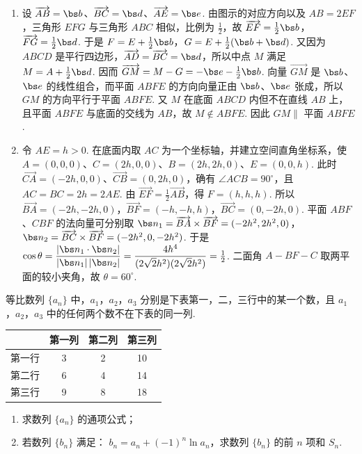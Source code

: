 \begin{solution}
\begin{enumerate}
\item 设 \(\overrightarrow{AB}=\bs b\)、\(\overrightarrow{BC}=\bs d\)、\(\overrightarrow{AE}=\bs e\). 由图示的对应方向以及 \(AB=2EF\)，三角形 \(EFG\) 与三角形 \(ABC\) 相似，比例为 \(\frac12\)，故
\(\overrightarrow{EF}=\frac12\bs b\)，\(\overrightarrow{FG}=\frac12\bs d\).
于是 \(F=E+\frac12\bs b\)，\(G=E+\frac12(\bs b+\bs d)\). 又因为 \(ABCD\) 是平行四边形，\(\overrightarrow{AD}=\overrightarrow{BC}=\bs d\)，所以中点 \(M\) 满足 \(M=A+\frac12\bs d\). 因而
\(\overrightarrow{GM}=M-G=-\bs e-\frac12\bs b\).
向量 \(\overrightarrow{GM}\) 是 \(\bs b\)、\(\bs e\) 的线性组合，而平面 \(ABFE\) 的方向向量正由 \(\bs b\)、\(\bs e\) 张成，所以 \(GM\) 的方向平行于平面 \(ABFE\). 又 \(M\) 在底面 \(ABCD\) 内但不在直线 \(AB\) 上，且平面 \(ABFE\) 与底面的交线为 \(AB\)，故 \(M\notin ABFE\). 因此 \(GM\parallel\) 平面 \(ABFE\).
\item 令 \(AE=h>0\). 在底面内取 \(AC\) 为一个坐标轴，并建立空间直角坐标系，使
\(A=(0,0,0)\)、\(C=(2h,0,0)\)、\(B=(2h,2h,0)\)、\(E=(0,0,h)\). 此时
\(\overrightarrow{CA}=(-2h,0,0)\)、\(\overrightarrow{CB}=(0,2h,0)\)，确有 \(\angle ACB=90^\circ\)，且 \(AC=BC=2h=2AE\).
由 \(\overrightarrow{EF}=\frac12\overrightarrow{AB}\)，得 \(F=(h,h,h)\). 所以
\(\overrightarrow{BA}=(-2h,-2h,0)\)，\(\overrightarrow{BF}=(-h,-h,h)\)，\(\overrightarrow{BC}=(0,-2h,0)\).
平面 \(ABF\)、\(CBF\) 的法向量可分别取
\(\bs n_1=\overrightarrow{BA}\times\overrightarrow{BF}=(-2h^2,2h^2,0)\)，
\(\bs n_2=\overrightarrow{BC}\times\overrightarrow{BF}=(-2h^2,0,-2h^2)\).
于是
\(\cos\theta=\dfrac{|\bs n_1\cdot\bs n_2|}{|\bs n_1|\,|\bs n_2|}=\dfrac{4h^4}{(2\sqrt2h^2)(2\sqrt2h^2)}=\frac12\).
二面角 \(A-BF-C\) 取两平面的较小夹角，故 \(\theta=60^\circ\).
\end{enumerate}
\end{solution}

\begin{problem}
等比数列 \(\{a_{n}\}\) 中，\(a_{1}\)，\(a_{2}\)，\(a_{3}\) 分别是下表第一，二，三行中的某一个数，且 \(a_{1}\)，\(a_{2}\)，\(a_{3}\) 中的任何两个数不在下表的同一列.

\begin{center}
\begin{tabular}{c|ccc}
 & 第一列 & 第二列 & 第三列 \\
\hline
第一行 & 3 & 2 & 10 \\
第二行 & 6 & 4 & 14 \\
第三行 & 9 & 8 & 18
\end{tabular}
\end{center}

\begin{enumerate}
\item 求数列 \(\{a_{n}\}\) 的通项公式；
\item 若数列 \(\{b_{n}\}\) 满足： \(b_{n} = a_{n} + (-1)^{n} \ln a_{n}\)，求数列 \(\{b_{n}\}\) 的前 \(n\) 项和 \(S_{n}\).
\end{enumerate}
\end{problem}

